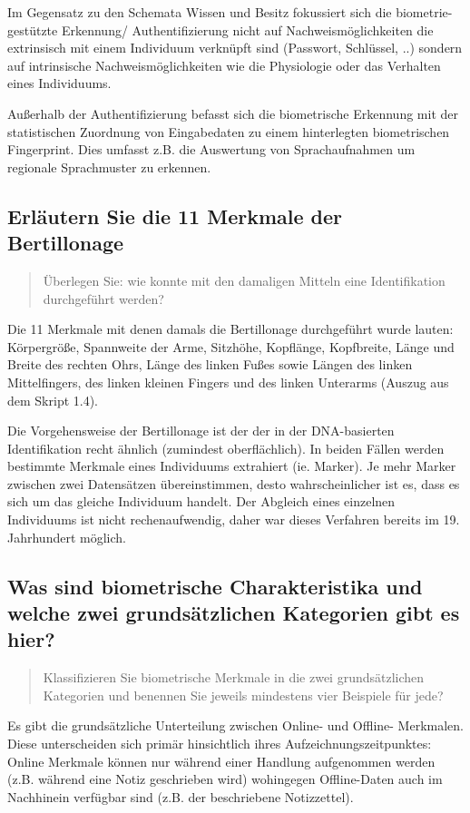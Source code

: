 \documentclass{article}
\newcommand{\annotation}[1]{
    \begin{quote}
    	\begin{textit}
			{#1}
	    \end{textit}
    \end{quote}
}
\begin{document}
Im Gegensatz zu den Schemata Wissen und Besitz fokussiert sich die biometrie-gestützte Erkennung/
Authentifizierung nicht auf Nachweismöglichkeiten die extrinsisch mit einem Individuum verknüpft sind 
(Passwort, Schlüssel, ..) sondern auf intrinsische Nachweismöglichkeiten wie die Physiologie oder das
Verhalten eines Individuums.

Außerhalb der Authentifizierung befasst sich die biometrische Erkennung mit der statistischen Zuordnung 
von Eingabedaten zu einem hinterlegten biometrischen Fingerprint. Dies umfasst z.B. die Auswertung von 
Sprachaufnahmen um regionale Sprachmuster zu erkennen.

\subsection{Erläutern Sie die 11 Merkmale der Bertillonage}
\annotation{{\"U}berlegen Sie: wie konnte mit den damaligen Mitteln eine Identifikation durchgeführt werden?}

Die 11 Merkmale mit denen damals die Bertillonage durchgeführt wurde lauten: Körpergröße, Spannweite der 
Arme, Sitzhöhe, Kopflänge, Kopfbreite, Länge und Breite des rechten Ohrs, Länge des linken Fußes sowie 
Längen des linken Mittelfingers, des linken kleinen Fingers und des linken Unterarms (Auszug aus dem 
Skript 1.4).

Die Vorgehensweise der Bertillonage ist der der in der DNA-basierten Identifikation recht ähnlich (zumindest 
oberflächlich). In beiden Fällen werden bestimmte Merkmale eines Individuums extrahiert (ie. Marker).
Je mehr Marker zwischen zwei Datensätzen übereinstimmen, desto wahrscheinlicher ist es, dass es sich um 
das gleiche Individuum handelt. Der Abgleich eines einzelnen Individuums ist nicht rechenaufwendig, daher 
war dieses Verfahren bereits im 19. Jahrhundert möglich.

\subsection{Was sind biometrische Charakteristika und welche zwei grundsätzlichen Kategorien gibt es hier?}
\annotation{Klassifizieren Sie biometrische Merkmale in die zwei grundsätzlichen Kategorien und benennen Sie jeweils mindestens vier Beispiele für jede?}	

Es gibt die grundsätzliche Unterteilung zwischen Online- und Offline- Merkmalen. Diese unterscheiden sich
primär hinsichtlich ihres Aufzeichnungszeitpunktes: Online Merkmale können nur während einer Handlung 
aufgenommen werden (z.B. während eine Notiz geschrieben wird) wohingegen Offline-Daten auch im Nachhinein
verfügbar sind (z.B. der beschriebene Notizzettel).
\end{document}
